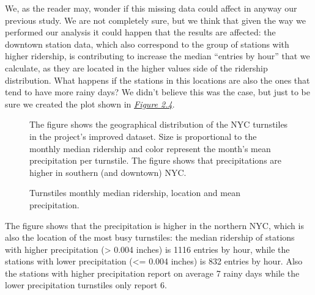 \documentclass[letterpaper,10pt,english]{sphinxmanual}
\begin{document}
We, as the reader may, wonder if this missing data could affect in anyway
our previous study. We are not completely sure, but we think that given the way
we performed our analysis it could happen that the results are affected: the downtown
station data, which also correspond to the group of stations with higher ridership,
is contributing to increase the median ``entries by hour'' that we calculate, as they are
located in the higher values side of the ridership distribution. What happens if
the stations in this locations are also the ones that tend to have more rainy days?
We didn't believe this was the case, but just to be sure we created the
plot shown in {\hyperref[section1:figure24]{\emph{Figure 2.4}}}.
\begin{figure}[htbp]
\centering
\capstart

\caption{Turnstiles monthly median ridership, location and mean precipitation.}{\small 
The figure shows the geographical distribution of the NYC turnstiles in the
project's improved dataset. Size is proportional to the monthly median ridership
and color represent the month's mean precipitation per turnstile. The figure
shows that precipitations are higher in southern (and downtown) NYC.
}\label{section1:figure24}\end{figure}

The figure shows that the precipitation is higher in the northern NYC, which is
also the location of the most busy turnstiles: the median ridership of stations with
higher precipitation (\textgreater{} 0.004 inches) is 1116 entries by hour, while the stations
with lower precipitation (\textless{}= 0.004 inches) is 832 entries by hour. Also the stations
with higher precipitation report on average 7 rainy days while the lower precipitation
turnstiles only report 6.
\end{document}
